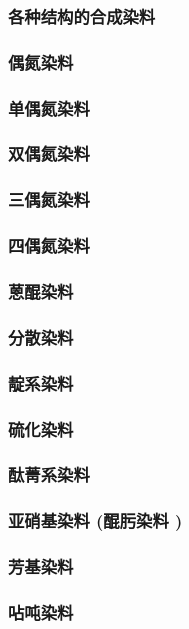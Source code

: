 \documentclass[UTF8]{../../ApplicationUniverse}
\begin{document}
\subsubsection{各种结构的合成染料}
    \subsubsection{偶氮染料}
        \subsubsection{单偶氮染料}
        \subsubsection{双偶氮染料}
        \subsubsection{三偶氮染料}
        \subsubsection{四偶氮染料}
    \subsubsection{蒽醌染料}
        \subsubsection{分散染料}
    \subsubsection{靛系染料}
    \subsubsection{硫化染料}
    \subsubsection{酞菁系染料}
    \subsubsection{亚硝基染料 (醌肟染料 )}
    \subsubsection{芳基染料}
    \subsubsection{呫吨染料}
\end{document}
